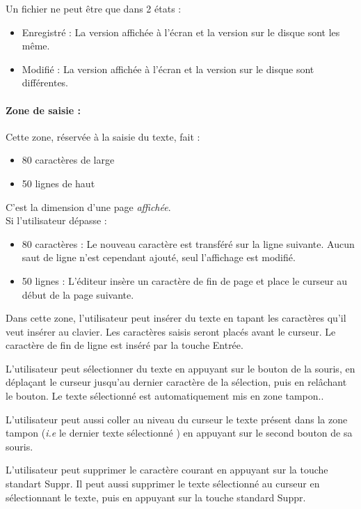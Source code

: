 Un fichier ne peut être que dans 2 états :
\begin{itemize}
	\item Enregistré : La version affichée à l'écran et la version sur le disque sont les même.
	\item Modifié :	La version affichée à l'écran et la version sur le disque sont différentes.
\end{itemize}

\paragraph{Zone de saisie :} Cette zone, réservée à la saisie du texte, fait :
\begin{itemize}
	\item 80 caractères de large
	\item 50 lignes de haut
\end{itemize}
C'est la dimension d'une page \emph{affichée}.\\

Si l'utilisateur dépasse :
\begin{itemize}
	\item 80 caractères : Le nouveau caractère est transféré sur la ligne suivante. Aucun saut de ligne n'est cependant ajouté, seul l'affichage est modifié.
	\item 50 lignes : L'éditeur insère un caractère de fin de page et place le curseur au début de la page suivante.\\
\end{itemize}

Dans cette zone, l'utilisateur peut insérer du texte en tapant les caractères qu'il veut insérer au clavier. Les caractères saisis seront placés avant le curseur. Le caractère de fin de ligne est inséré par la touche \og Entrée\fg.

L'utilisateur peut sélectionner du texte en appuyant sur le bouton de la
souris, en déplaçant le curseur jusqu'au dernier caractère de la sélection,
puis en relâchant le bouton. Le texte sélectionné est automatiquement mis
en zone tampon..

L'utilisateur peut aussi coller au niveau du curseur le texte présent dans la zone tampon (\textsl{i.e} le dernier texte sélectionné ) en appuyant sur le second bouton de sa souris.

L'utilisateur peut supprimer le caractère courant en appuyant sur la touche standart \og Suppr\fg. Il peut aussi supprimer le texte sélectionné au curseur en sélectionnant le texte, puis en appuyant sur la touche standard \og Suppr\fg.

